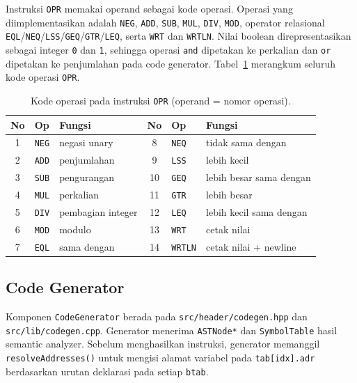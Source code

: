 \documentclass[11pt,a4paper]{article}
\begin{document}
Instruksi \texttt{OPR} memakai operand sebagai kode operasi. Operasi yang
diimplementasikan adalah \texttt{NEG}, \texttt{ADD}, \texttt{SUB},
\texttt{MUL}, \texttt{DIV}, \texttt{MOD}, operator relasional
\texttt{EQL}/\texttt{NEQ}/\texttt{LSS}/\texttt{GEQ}/\texttt{GTR}/\texttt{LEQ},
serta \texttt{WRT} dan \texttt{WRTLN}. Nilai boolean direpresentasikan sebagai
integer \texttt{0} dan \texttt{1}, sehingga operasi \texttt{and} dipetakan ke
perkalian dan \texttt{or} dipetakan ke penjumlahan pada code generator.
Tabel~\ref{tab:opr} merangkum seluruh kode operasi \texttt{OPR}.

\begin{table}[H]
\centering
\footnotesize
\begin{tabularx}{\textwidth}{c l X c l X}
\toprule
\textbf{No} & \textbf{Op} & \textbf{Fungsi} & \textbf{No} & \textbf{Op} & \textbf{Fungsi} \\
\midrule
1 & \texttt{NEG} & negasi unary      & 8  & \texttt{NEQ}   & tidak sama dengan \\
2 & \texttt{ADD} & penjumlahan       & 9  & \texttt{LSS}   & lebih kecil \\
3 & \texttt{SUB} & pengurangan       & 10 & \texttt{GEQ}   & lebih besar sama dengan \\
4 & \texttt{MUL} & perkalian         & 11 & \texttt{GTR}   & lebih besar \\
5 & \texttt{DIV} & pembagian integer & 12 & \texttt{LEQ}   & lebih kecil sama dengan \\
6 & \texttt{MOD} & modulo            & 13 & \texttt{WRT}   & cetak nilai \\
7 & \texttt{EQL} & sama dengan       & 14 & \texttt{WRTLN} & cetak nilai + newline \\
\bottomrule
\end{tabularx}
\caption{Kode operasi pada instruksi \texttt{OPR} (operand = nomor operasi).}
\label{tab:opr}
\end{table}

\subsection{Code Generator}

Komponen \texttt{CodeGenerator} berada pada \texttt{src/header/codegen.hpp} dan
\texttt{src/lib/codegen.cpp}. Generator menerima \texttt{ASTNode*} dan
\texttt{SymbolTable} hasil semantic analyzer. Sebelum menghasilkan instruksi,
generator memanggil \texttt{resolveAddresses()} untuk mengisi alamat variabel
pada \texttt{tab[idx].adr} berdasarkan urutan deklarasi pada setiap
\texttt{btab}.
\end{document}
